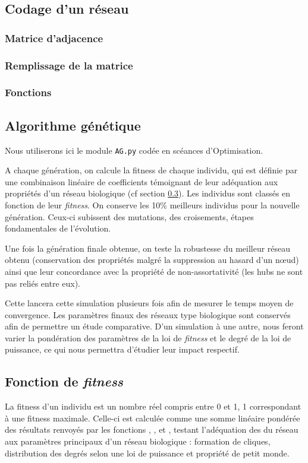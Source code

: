 \subsection{Codage d'un réseau}
\subsubsection{Matrice d'adjacence}
\subsubsection{Remplissage de la matrice}
\subsubsection{Fonctions}

\subsection{Algorithme génétique}
Nous utiliserons ici le module \texttt{AG.py} codée en scéances d'Optimisation. 

A chaque génération, on calcule la fitness de chaque individu, qui est définie par une combinaison linéaire de coefficients témoignant de leur adéquation aux propriétés d'un réseau biologique (cf section \ref{fitness}).
Les individus sont classés en fonction de leur \textit{fitness}. On conserve les 10\% meilleurs individus pour la nouvelle génération. Ceux-ci subissent des mutations, des croisements, étapes fondamentales de l'évolution.

Une fois la génération finale obtenue, on teste la robustesse du meilleur réseau obtenu (conservation des propriétés malgré la suppression au hasard d'un nœud) ainsi que leur concordance avec la propriété de non-assortativité (les hubs ne sont pas reliés entre eux).

Cette lancera cette simulation plusieurs fois afin de mesurer le temps moyen de convergence.
Les paramètres finaux des réseaux type \og biologique \fg sont conservés afin de permettre un étude comparative. D'un simulation à une autre, nous feront varier la pondération des paramètres de la loi de \textit{fitness} et le degré de la loi de puissance, ce qui nous permettra d'étudier leur impact respectif.

\subsection{Fonction de \textit{fitness} }
\label{fitness}
La fitness d'un individu est un nombre réel compris entre 0 et 1, 1 correspondant à une fitness maximale.
Celle-ci est calculée comme une somme linéaire pondérée des résultats renvoyés par les fonctions \texttt{}, \texttt{}, et \texttt{}, testant l'adéquation des du réseau aux paramètres principaux d'un réseau biologique : formation de cliques, distribution des degrés selon une loi de puissance et propriété de petit monde.


